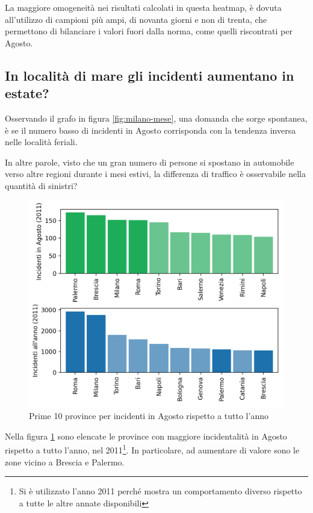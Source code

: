 \documentclass[a4paper,12pt]{report}
\begin{document}
La maggiore omogeneità nei risultati calcolati in questa heatmap, 
è dovuta all'utilizzo di campioni più ampi, di novanta giorni e non di trenta, 
che permettono di bilanciare i valori fuori dalla norma, 
come quelli riscontrati per Agosto. 

\subsection{In località di mare gli incidenti aumentano in estate?}

Osservando il grafo in figura \ref{fig:milano-mese}, una domanda che sorge spontanea, è se 
il numero basso di incidenti in Agosto corrisponda con la tendenza inversa nelle 
località feriali. 

In altre parole, visto che un gran numero di persone si spostano in automobile 
verso altre regioni durante i mesi estivi, la differenza di traffico è osservabile 
nella quantità di sinistri?

\begin{figure}
    \includegraphics[width=\linewidth]{../src/incidenti/incidenti_senza_coords/mese_incidenti/mesi_estivi.png}
    \caption{Prime 10 province per incidenti in Agosto rispetto a tutto l'anno}
    \label{fig:mesi-estivi}
\end{figure}

Nella figura \ref{fig:mesi-estivi} sono elencate le province con maggiore incidentalità 
in Agosto rispetto a tutto l'anno, nel 
2011\footnote{Si è utilizzato l'anno 2011 perché mostra un comportamento diverso rispetto a 
tutte le altre annate disponibili}. 
In particolare, ad aumentare di valore sono le zone vicino a Brescia e Palermo. 
\end{document}
